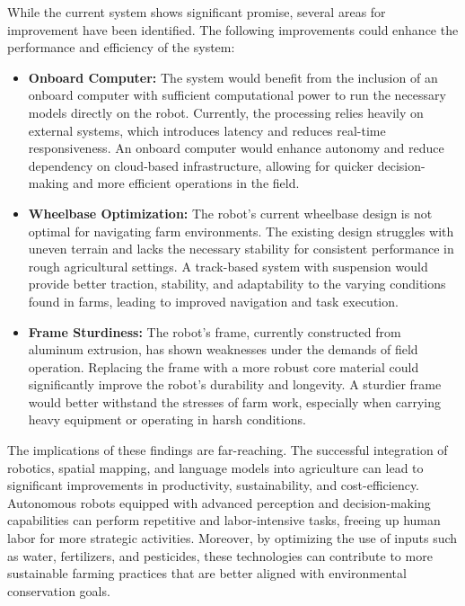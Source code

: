 While the current system shows significant promise, several areas for improvement have been identified. The following improvements could enhance the performance and efficiency of the system:

\begin{itemize}
    \item \textbf{Onboard Computer:} The system would benefit from the inclusion of an onboard computer with sufficient computational power to run the necessary models directly on the robot. Currently, the processing relies heavily on external systems, which introduces latency and reduces real-time responsiveness. An onboard computer would enhance autonomy and reduce dependency on cloud-based infrastructure, allowing for quicker decision-making and more efficient operations in the field.
    \item \textbf{Wheelbase Optimization:} The robot's current wheelbase design is not optimal for navigating farm environments. \cite{Elsheikh2023} The existing design struggles with uneven terrain and lacks the necessary stability for consistent performance in rough agricultural settings. A track-based system with suspension would provide better traction, stability, and adaptability to the varying conditions found in farms, leading to improved navigation and task execution.
    \item \textbf{Frame Sturdiness:} The robot's frame, currently constructed from aluminum extrusion, has shown weaknesses under the demands of field operation. Replacing the frame with a more robust core material could significantly improve the robot's durability and longevity. A sturdier frame would better withstand the stresses of farm work, especially when carrying heavy equipment or operating in harsh conditions.
\end{itemize}

The implications of these findings are far-reaching. The successful integration of robotics, spatial mapping, and language models into agriculture can lead to significant improvements in productivity, sustainability, and cost-efficiency. Autonomous robots equipped with advanced perception and decision-making capabilities can perform repetitive and labor-intensive tasks, freeing up human labor for more strategic activities. Moreover, by optimizing the use of inputs such as water, fertilizers, and pesticides, these technologies can contribute to more sustainable farming practices that are better aligned with environmental conservation goals.

